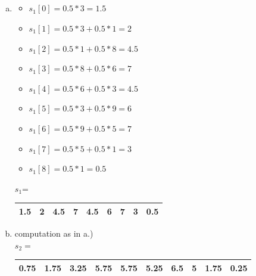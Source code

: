 \documentclass[12pt]{article}
\begin{document}

\setcounter{section}{8}
\setcounter{subsection}{0}

\subsection{ }

\begin{enumerate}[a)]
\item
\begin{itemize}
	\item $s_1[0]= 0.5 * 3 = 1.5 $
	\item $s_1[1]= 0.5 * 3 + 0.5 * 1 = 2 $
	\item $s_1[2]= 0.5 * 1 + 0.5 * 8 = 4.5 $	
	\item $s_1[3]= 0.5 * 8 + 0.5 * 6 = 7 $
	\item $s_1[4]= 0.5 * 6 + 0.5 * 3 = 4.5 $	
	\item $s_1[5]= 0.5 * 3 + 0.5 * 9 = 6 $
	\item $s_1[6]= 0.5 * 9 + 0.5 * 5 = 7 $
	\item $s_1[7]= 0.5 * 5 + 0.5 * 1 = 3 $
	\item $s_1[8]= 0.5 * 1 = 0.5 $
\end{itemize}
$s_1$=\begin{tabular}{|c|c|c|c|c|c|c|c|c|}
\hline
1.5 & 2 & 4.5 & 7 & 4.5 & 6 & 7 & 3 & 0.5\\ \hline
\end{tabular}
\item
computation as in a.) \\
$s_2=$\begin{tabular}{|c|c|c|c|c|c|c|c|c|c|}
\hline
0.75 & 1.75 & 3.25 & 5.75 & 5.75 & 5.25 & 6.5 & 5 & 1.75 & 0.25\\ \hline
\end{tabular}


\end{enumerate}
\end{document}
